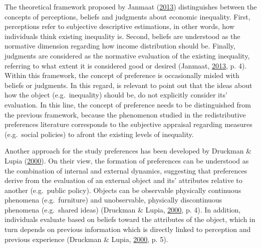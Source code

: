 \documentclass[
  12pt,
]{book}
\begin{document}
The theoretical framework proposed by Janmaat (\protect\hyperlink{ref-Janmaat2013}{2013}) distinguishes between the concepts of perceptions, beliefs and judgments about economic inequality. First, perceptions refer to subjective descriptive estimations, in other words, how individuals think existing inequality is. Second, beliefs are understood as the normative dimension regarding how income distribution should be. Finally, judgments are considered as the normative evaluation of the existing inequality, referring to what extent it is considered good or desired (Janmaat, \protect\hyperlink{ref-Janmaat2013}{2013}, p. 4). Within this framework, the concept of preference is occasionally misled with beliefs or judgments. In this regard, is relevant to point out that the ideas about how the object (e.g.~inequality) should be, do not explicitly consider its' evaluation. In this line, the concept of preference needs to be distinguished from the previous framework, because the phenomenon studied in the redistributive preferences literature corresponds to the subjective appraisal regarding measures (e.g.~social policies) to afront the existing levels of inequality.

Another approach for the study preferences has been developed by Druckman \& Lupia (\protect\hyperlink{ref-druckman_preference_2000}{2000}). On their view, the formation of preferences can be understood as the combination of internal and external dynamics, suggesting that preferences derive from the evaluation of an external object and its' attributes relative to another (e.g.~public policy). Objects can be observable physically continuous phenomena (e.g.~furniture) and unobservable, physically discontinuous phenomena (e.g.~shared ideas) (Druckman \& Lupia, \protect\hyperlink{ref-druckman_preference_2000}{2000}, p. 4). In addition, individuals evaluate based on beliefs toward the attributes of the object, which in turn depends on previous information which is directly linked to perception and previous experience (Druckman \& Lupia, \protect\hyperlink{ref-druckman_preference_2000}{2000}, p. 5).
\end{document}
